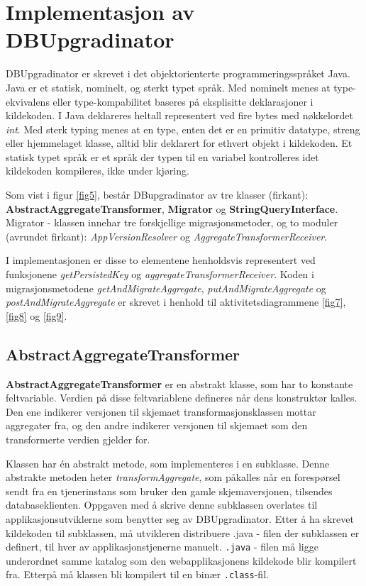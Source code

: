 \section{Implementasjon av DBUpgradinator}

DBUpgradinator er skrevet i det objektorienterte programmeringsspråket Java. Java er et statisk, nominelt, og sterkt typet språk. Med nominelt menes at type-ekvivalens eller type-kompabilitet baseres på eksplisitte deklarasjoner i kildekoden. I Java deklareres heltall representert ved fire bytes med nøkkelordet \emph{int}. Med sterk typing menes at en type, enten det er en primitiv datatype, streng eller hjemmelaget klasse, alltid blir deklarert for ethvert objekt i kildekoden. Et statisk typet språk er et språk der typen til en variabel kontrolleres idet kildekoden kompileres, ikke under kjøring.

Som vist i figur \ref{fig5}, består DBupgradinator av tre klasser (firkant): \textbf{AbstractAggregateTransformer}, \textbf{Migrator} og \textbf{StringQueryInterface}. Migrator - klassen innehar tre forskjellige migrasjonsmetoder, og to moduler (avrundet firkant): \emph{AppVersionResolver} og \emph{AggregateTransformerReceiver}.

I implementasjonen er disse to elementene henholdsvis representert ved funksjonene \emph{getPersistedKey} og \emph{aggregateTransformerReceiver}. Koden i migrasjonsmetodene \emph{getAndMigrateAggregate}, \emph{putAndMigrateAggregate} og \emph{postAndMigrateAggregate} er skrevet i henhold til aktivitetsdiagrammene \ref{fig7}, \ref{fig8} og \ref{fig9}.

\newpage
\subsection{AbstractAggregateTransformer}



\textbf{AbstractAggregateTransformer} er en abstrakt klasse, som har to konstante feltvariable. Verdien på disse feltvariablene defineres når dens konstruktør kalles. Den ene indikerer versjonen til skjemaet transformasjonsklassen mottar aggregater fra, og den andre indikerer versjonen til skjemaet som den transformerte verdien gjelder for.

Klassen har én abstrakt metode, som implementeres i en subklasse. Denne abstrakte metoden heter \emph{transformAggregate}, som påkalles når en forespørsel sendt fra en tjenerinstans som bruker den gamle skjemaversjonen, tilsendes databaseklienten. Oppgaven med å skrive denne subklassen overlates til applikasjonsutviklerne som benytter seg av DBUpgradinator. Etter å ha skrevet kildekoden til subklassen, må utvikleren distribuere .java - filen der subklassen er definert, til hver av applikasjonstjenerne manuelt. \texttt{.java} - filen må ligge underordnet samme katalog som den webapplikasjonens kildekode blir kompilert fra. Etterpå må klassen bli kompilert til en binær \texttt{.class}-fil.


